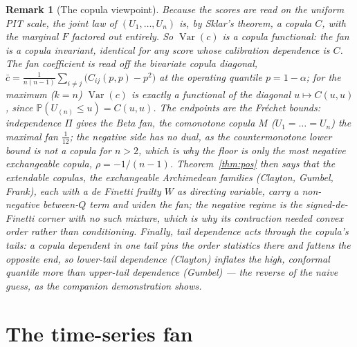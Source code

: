 \documentclass[11pt]{article}
\newtheorem{remark}{Remark}
\begin{document}
\begin{remark}[The copula viewpoint]\label{rmk:copula}
Because the scores are read on the uniform PIT scale, the joint law of $(U_1,\dots,U_n)$ is, by Sklar's
theorem, a copula $C$, with the marginal $F$ factored out entirely. So $\operatorname{Var}(c)$ is a
\emph{copula functional}: the fan is a copula invariant, identical for any score whose calibration
dependence is $C$. The fan coefficient is read off the bivariate copula diagonal,
$\bar c=\tfrac1{n(n-1)}\sum_{i\ne j}\big(C_{ij}(p,p)-p^2\big)$ at the operating quantile $p=1-\alpha$;
for the maximum ($k=n$) $\operatorname{Var}(c)$ is exactly a functional of the diagonal $u\mapsto
C(u,u)$, since $\mathbb P(U_{(n)}\le u)=C(u,u)$. The endpoints are the Fr\'echet bounds: independence
$\Pi$ gives the Beta fan, the comonotone copula $M$ ($U_1=\dots=U_n$) the maximal fan $\tfrac1{12}$;
the negative side has no dual, as the countermonotone lower bound is not a copula for $n>2$, which is
why the floor is only the most negative \emph{exchangeable} copula, $\rho=-1/(n-1)$.
Theorem~\ref{thm:pos} then says that the \emph{extendable} copulas, the exchangeable Archimedean
families (Clayton, Gumbel, Frank), each with a de Finetti frailty $W$ as directing variable, carry a
non-negative between-$Q$ term and widen the fan; the negative regime is the signed-de-Finetti corner
with no such mixture, which is why its contraction needed convex order rather than conditioning.
Finally, tail dependence acts through the copula's tails: a copula dependent in one tail pins the
order statistics there and fattens the opposite end, so lower-tail dependence (Clayton) inflates the
high, conformal quantile more than upper-tail dependence (Gumbel) --- the reverse of the naive guess,
as the companion demonstration shows.
\end{remark}

\section{The time-series fan}\label{sec:tsfan}
\end{document}
